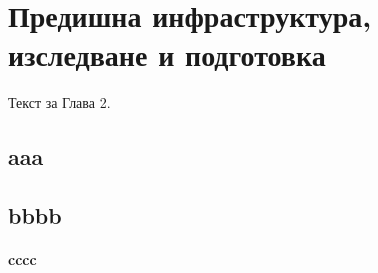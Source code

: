 \chapter{Предишна инфраструктура, изследване и подготовка}\label{Sect2}

Текст за Глава 2.

\section{aaa}
\section{bbbb}
\subsubsection{cccc}